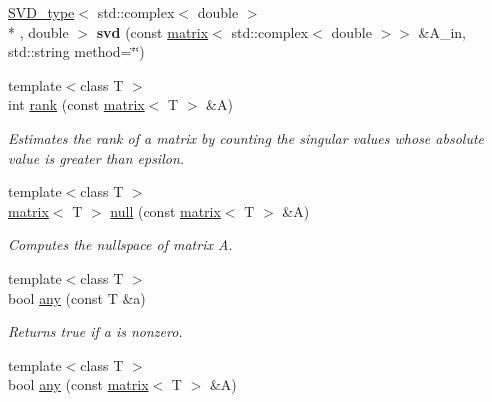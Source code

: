 \begin{DoxyCompactItemize}
\item 
\hypertarget{namespacekeycpp_ab96149e6d3b76c5363601903c4fb72bb}{\hyperlink{structkeycpp_1_1_s_v_d__type}{S\-V\-D\-\_\-type}$<$ std\-::complex$<$ double $>$\\*
, double $>$ {\bfseries svd} (const \hyperlink{classkeycpp_1_1matrix}{matrix}$<$ std\-::complex$<$ double $>$$>$ \&A\-\_\-in, std\-::string method=\char`\"{}\char`\"{})}\label{namespacekeycpp_ab96149e6d3b76c5363601903c4fb72bb}

\item 
\hypertarget{namespacekeycpp_aeb9efbc77cc58fa22403ea7ae5f4555c}{{\footnotesize template$<$class T $>$ }\\int \hyperlink{namespacekeycpp_aeb9efbc77cc58fa22403ea7ae5f4555c}{rank} (const \hyperlink{classkeycpp_1_1matrix}{matrix}$<$ T $>$ \&A)}\label{namespacekeycpp_aeb9efbc77cc58fa22403ea7ae5f4555c}

\begin{DoxyCompactList}\small\item\em Estimates the rank of a matrix by counting the singular values whose absolute value is greater than epsilon. \end{DoxyCompactList}\item 
\hypertarget{namespacekeycpp_a8f497e2da901adba0e1257be943595a1}{{\footnotesize template$<$class T $>$ }\\\hyperlink{classkeycpp_1_1matrix}{matrix}$<$ T $>$ \hyperlink{namespacekeycpp_a8f497e2da901adba0e1257be943595a1}{null} (const \hyperlink{classkeycpp_1_1matrix}{matrix}$<$ T $>$ \&A)}\label{namespacekeycpp_a8f497e2da901adba0e1257be943595a1}

\begin{DoxyCompactList}\small\item\em Computes the nullspace of matrix A. \end{DoxyCompactList}\item 
\hypertarget{namespacekeycpp_a70b89ab3e8f66f86c47c3bde004d4487}{{\footnotesize template$<$class T $>$ }\\bool \hyperlink{namespacekeycpp_a70b89ab3e8f66f86c47c3bde004d4487}{any} (const T \&a)}\label{namespacekeycpp_a70b89ab3e8f66f86c47c3bde004d4487}

\begin{DoxyCompactList}\small\item\em Returns true if a is nonzero. \end{DoxyCompactList}\item 
\hypertarget{namespacekeycpp_ade6d308fd22d34ad4860e5fcd22ccb39}{{\footnotesize template$<$class T $>$ }\\bool \hyperlink{namespacekeycpp_ade6d308fd22d34ad4860e5fcd22ccb39}{any} (const \hyperlink{classkeycpp_1_1matrix}{matrix}$<$ T $>$ \&A)}\label{namespacekeycpp_ade6d308fd22d34ad4860e5fcd22ccb39}


\end{DoxyCompactItemize}
